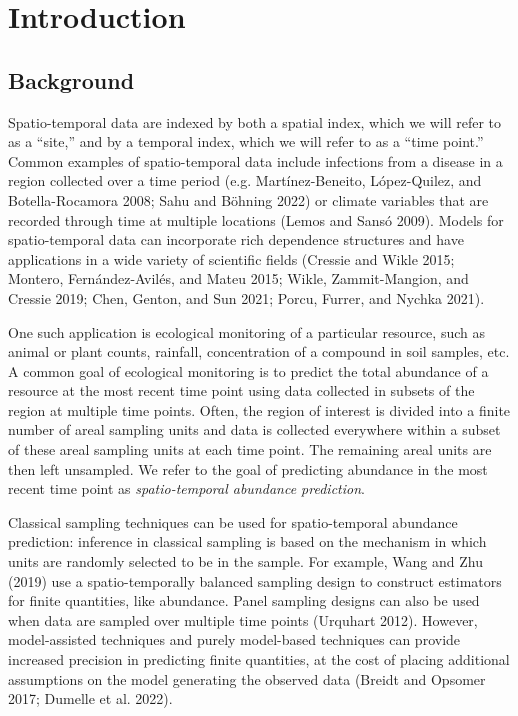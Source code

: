 \documentclass[]{article}    %
\begin{document}
\hypertarget{intro}{%
\section{Introduction}\label{intro}}

\hypertarget{background}{%
\subsection{Background}\label{background}}

Spatio-temporal data are indexed by both a spatial index, which we will
refer to as a ``site,'' and by a temporal index, which we will refer to
as a ``time point.'' Common examples of spatio-temporal data include
infections from a disease in a region collected over a time period (e.g.
Martínez-Beneito, López-Quilez, and Botella-Rocamora 2008; Sahu and
Böhning 2022) or climate variables that are recorded through time at
multiple locations (Lemos and Sansó 2009). Models for spatio-temporal
data can incorporate rich dependence structures and have applications in
a wide variety of scientific fields (Cressie and Wikle 2015; Montero,
Fernández-Avilés, and Mateu 2015; Wikle, Zammit-Mangion, and Cressie
2019; Chen, Genton, and Sun 2021; Porcu, Furrer, and Nychka 2021).

One such application is ecological monitoring of a particular resource,
such as animal or plant counts, rainfall, concentration of a compound in
soil samples, etc. A common goal of ecological monitoring is to predict
the total abundance of a resource at the most recent time point using
data collected in subsets of the region at multiple time points. Often,
the region of interest is divided into a finite number of areal sampling
units and data is collected everywhere within a subset of these areal
sampling units at each time point. The remaining areal units are then
left unsampled. We refer to the goal of predicting abundance in the most
recent time point as \emph{spatio-temporal abundance prediction}.

Classical sampling techniques can be used for spatio-temporal abundance
prediction: inference in classical sampling is based on the mechanism in
which units are randomly selected to be in the sample. For example, Wang
and Zhu (2019) use a spatio-temporally balanced sampling design to
construct estimators for finite quantities, like abundance. Panel
sampling designs can also be used when data are sampled over multiple
time points (Urquhart 2012). However, model-assisted techniques and
purely model-based techniques can provide increased precision in
predicting finite quantities, at the cost of placing additional
assumptions on the model generating the observed data (Breidt and
Opsomer 2017; Dumelle et al. 2022).
\end{document}
